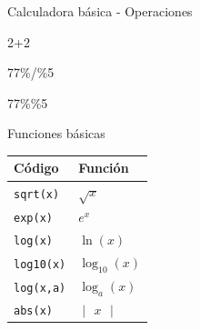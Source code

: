 \documentclass[
  ignorenonframetext,
  aspectratio=169]{beamer}
\newenvironment{Shaded}{\begin{snugshade}}{\end{snugshade}}
\newcommand{\DecValTok}[1]{\textcolor[rgb]{0.00,0.00,0.81}{#1}}
\newcommand{\SpecialCharTok}[1]{\textcolor[rgb]{0.00,0.00,0.00}{#1}}
\let\oldverbatim\verbatim
\let\endoldverbatim\endverbatim
\renewenvironment{verbatim}{\tiny\oldverbatim}{\endoldverbatim}
\begin{document}
\begin{frame}[fragile]{Calculadora básica - Operaciones}
\protect\hypertarget{calculadora-buxe1sica---operaciones-1}{}
\begin{Shaded}
\begin{Highlighting}[]
\DecValTok{2}\SpecialCharTok{+}\DecValTok{2}
\end{Highlighting}
\end{Shaded}

\begin{verbatim}
[1] 4
\end{verbatim}

\begin{Shaded}
\begin{Highlighting}[]
\DecValTok{77}\SpecialCharTok{\%/\%}\DecValTok{5}
\end{Highlighting}
\end{Shaded}

\begin{verbatim}
[1] 15
\end{verbatim}

\begin{Shaded}
\begin{Highlighting}[]
\DecValTok{77}\SpecialCharTok{\%\%}\DecValTok{5}
\end{Highlighting}
\end{Shaded}

\begin{verbatim}
[1] 2
\end{verbatim}
\end{frame}

\begin{frame}[fragile]{Funciones básicas}
\protect\hypertarget{funciones-buxe1sicas}{}
\begin{longtable}[]{@{}ll@{}}
\toprule()
Código & Función \\
\midrule()
\endhead
\texttt{sqrt(x)} & \(\sqrt{x}\) \\
\texttt{exp(x)} & \(e^x\) \\
\texttt{log(x)} & \(\ln(x)\) \\
\texttt{log10(x)} & \(\log_{10}(x)\) \\
\texttt{log(x,a)} & \(\log_a(x)\) \\
\texttt{abs(x)} & \(\begin{vmatrix}x\end{vmatrix}\) \\
\bottomrule()
\end{longtable}
\end{frame}
\end{document}
